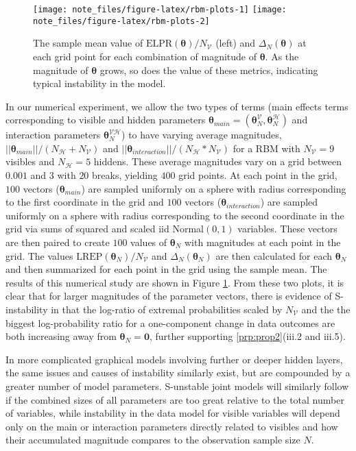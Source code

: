 \documentclass[numbib]{imamat}
\theoremstyle{theorem}
\theoremstyle{lemma}
\theoremstyle{example}
\theoremstyle{corollary}
\theoremstyle{definition}
\theoremstyle{remark}
\theoremstyle{approximation}
\theoremstyle{scheme}
\newcommand{\REP}{\mathrm{LREP}}
\newcommand{\DN}{\Delta_N}
\begin{document}
\par
\begin{figure}
\texttt{[image: note\_files/figure-latex/rbm-plots-1]} \texttt{[image: note\_files/figure-latex/rbm-plots-2]} \caption{The sample mean value of $\text{ELPR}(\boldsymbol \theta)/N_{\mathcal{V}}$ (left) and $\DN(\boldsymbol \theta)$ at each grid point for each combination of magnitude of $\boldsymbol \theta$. As the magnitude of $\boldsymbol \theta$ grows, so does the value of these metrics, indicating typical instability in the model.}\label{fig:rbm-plots}
\end{figure}
In our numerical experiment, we allow the two types of terms (main
effects terms corresponding to visible and hidden parameters
\(\boldsymbol \theta_{main} = (\boldsymbol \theta_N^{\mathcal{V}}, \boldsymbol \theta_N^{\mathcal{H}})\)
and interaction parameters \(\boldsymbol \theta_N^{\mathcal{VH}}\)) to
have varying average magnitudes,
\(||\boldsymbol \theta_{main} || /(N_{\mathcal{H}}+N_{\mathcal{V}})\)
and
\(||\boldsymbol \theta_{interaction} || /(N_{\mathcal{H}}*N_{\mathcal{V}})\)
for a RBM with \(N_\mathcal{V} = 9\) visibles and \(N_\mathcal{H} = 5\)
hiddens. These average magnitudes vary on a grid between \(0.001\) and
\(3\) with \(20\) breaks, yielding \(400\) grid points. At each point in
the grid, \(100\) vectors (\(\boldsymbol \theta_{main}\)) are sampled
uniformly on a sphere with radius corresponding to the first coordinate
in the grid and \(100\) vectors (\(\boldsymbol \theta_{interaction}\))
are sampled uniformly on a sphere with radius corresponding to the
second coordinate in the grid via sums of squared and scaled iid
Normal\((0, 1)\) variables. These vectors are then paired to create
\(100\) values of \(\boldsymbol \theta_N\) with magnitudes at each point
in the grid. The values \(\REP(\boldsymbol \theta_N)/N_{\mathcal{V}}\)
and \(\DN(\boldsymbol \theta_N)\) are then calculated for each
\(\boldsymbol \theta_N\) and then summarized for each point in the grid
using the sample mean. The results of this numerical study are shown in
Figure \ref{fig:rbm-plots}. From these two plots, it is clear that for
larger magnitudes of the parameter vectors, there is evidence of
S-instability in that the log-ratio of extremal probabilities scaled by
\(N_{\mathcal{V}}\) and the the biggest log-probability ratio for a
one-component change in data outcomes are both increasing away from
\(\boldsymbol \theta_N = \boldsymbol 0\), further supporting
\ref{prp:prop2}(iii.2 and iii.5).

In more complicated graphical models involving further or deeper hidden
layers, the same issues and causes of instability similarly exist, but
are compounded by a greater number of model parameters. S-unstable joint
models will similarly follow if the combined sizes of all parameters are
too great relative to the total number of variables, while instability
in the data model for visible variables will depend only on the main or
interaction parameters directly related to visibles and how their
accumulated magnitude compares to the observation sample size \(N\).
\end{document}
